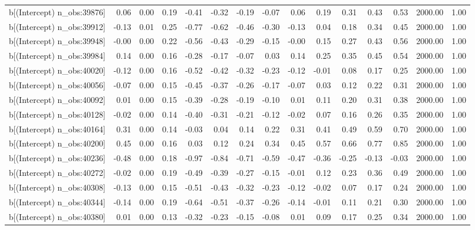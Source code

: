 \begin{table}[ht]
\begin{tabular}{rrrrrrrrrrrrrrr}
  b[(Intercept) n\_obs:39876] & 0.06 & 0.00 & 0.19 & -0.41 & -0.32 & -0.19 & -0.07 & 0.06 & 0.19 & 0.31 & 0.43 & 0.53 & 2000.00 & 1.00 \\ 
  b[(Intercept) n\_obs:39912] & -0.13 & 0.01 & 0.25 & -0.77 & -0.62 & -0.46 & -0.30 & -0.13 & 0.04 & 0.18 & 0.34 & 0.45 & 2000.00 & 1.00 \\ 
  b[(Intercept) n\_obs:39948] & -0.00 & 0.00 & 0.22 & -0.56 & -0.43 & -0.29 & -0.15 & -0.00 & 0.15 & 0.27 & 0.43 & 0.56 & 2000.00 & 1.00 \\ 
  b[(Intercept) n\_obs:39984] & 0.14 & 0.00 & 0.16 & -0.28 & -0.17 & -0.07 & 0.03 & 0.14 & 0.25 & 0.35 & 0.45 & 0.54 & 2000.00 & 1.00 \\ 
  b[(Intercept) n\_obs:40020] & -0.12 & 0.00 & 0.16 & -0.52 & -0.42 & -0.32 & -0.23 & -0.12 & -0.01 & 0.08 & 0.17 & 0.25 & 2000.00 & 1.00 \\ 
  b[(Intercept) n\_obs:40056] & -0.07 & 0.00 & 0.15 & -0.45 & -0.37 & -0.26 & -0.17 & -0.07 & 0.03 & 0.12 & 0.22 & 0.31 & 2000.00 & 1.00 \\ 
  b[(Intercept) n\_obs:40092] & 0.01 & 0.00 & 0.15 & -0.39 & -0.28 & -0.19 & -0.10 & 0.01 & 0.11 & 0.20 & 0.31 & 0.38 & 2000.00 & 1.00 \\ 
  b[(Intercept) n\_obs:40128] & -0.02 & 0.00 & 0.14 & -0.40 & -0.31 & -0.21 & -0.12 & -0.02 & 0.07 & 0.16 & 0.26 & 0.35 & 2000.00 & 1.00 \\ 
  b[(Intercept) n\_obs:40164] & 0.31 & 0.00 & 0.14 & -0.03 & 0.04 & 0.14 & 0.22 & 0.31 & 0.41 & 0.49 & 0.59 & 0.70 & 2000.00 & 1.00 \\ 
  b[(Intercept) n\_obs:40200] & 0.45 & 0.00 & 0.16 & 0.03 & 0.12 & 0.24 & 0.34 & 0.45 & 0.57 & 0.66 & 0.77 & 0.85 & 2000.00 & 1.00 \\ 
  b[(Intercept) n\_obs:40236] & -0.48 & 0.00 & 0.18 & -0.97 & -0.84 & -0.71 & -0.59 & -0.47 & -0.36 & -0.25 & -0.13 & -0.03 & 2000.00 & 1.00 \\ 
  b[(Intercept) n\_obs:40272] & -0.02 & 0.00 & 0.19 & -0.49 & -0.39 & -0.27 & -0.15 & -0.01 & 0.12 & 0.23 & 0.36 & 0.49 & 2000.00 & 1.00 \\ 
  b[(Intercept) n\_obs:40308] & -0.13 & 0.00 & 0.15 & -0.51 & -0.43 & -0.32 & -0.23 & -0.12 & -0.02 & 0.07 & 0.17 & 0.24 & 2000.00 & 1.00 \\ 
  b[(Intercept) n\_obs:40344] & -0.14 & 0.00 & 0.19 & -0.64 & -0.51 & -0.37 & -0.26 & -0.14 & -0.01 & 0.11 & 0.21 & 0.30 & 2000.00 & 1.00 \\ 
  b[(Intercept) n\_obs:40380] & 0.01 & 0.00 & 0.13 & -0.32 & -0.23 & -0.15 & -0.08 & 0.01 & 0.09 & 0.17 & 0.25 & 0.34 & 2000.00 & 1.00 \\ 

\end{tabular}
\end{table}
